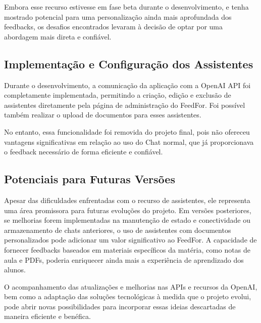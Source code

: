 Embora esse recurso estivesse em fase beta durante o desenvolvimento, e tenha mostrado potencial para uma personalização ainda mais aprofundada dos feedbacks, os desafios encontrados levaram à decisão de optar por uma abordagem mais direta e confiável.

\subsection{Implementação e Configuração dos Assistentes}

Durante o desenvolvimento, a comunicação da aplicação com a OpenAI API foi completamente implementada, permitindo a criação, edição e exclusão de assistentes diretamente pela página de administração do FeedFor. Foi possível também realizar o upload de documentos para esses assistentes.

No entanto, essa funcionalidade foi removida do projeto final, pois não ofereceu vantagens significativas em relação ao uso do Chat normal, que já proporcionava o feedback necessário de forma eficiente e confiável.

\subsection{Potenciais para Futuras Versões}

Apesar das dificuldades enfrentadas com o recurso de assistentes, ele representa uma área promissora para futuras evoluções do projeto. Em versões posteriores, se melhorias forem implementadas na manutenção de estado e conectividade ou armazenamento de chats anteriores, o uso de assistentes com documentos personalizados pode adicionar um valor significativo ao FeedFor. A capacidade de fornecer feedbacks baseados em materiais específicos da matéria, como notas de aula e PDFs, poderia enriquecer ainda mais a experiência de aprendizado dos alunos.

O acompanhamento das atualizações e melhorias nas APIs e recursos da OpenAI, bem como a adaptação das soluções tecnológicas à medida que o projeto evolui, pode abrir novas possibilidades para incorporar essas ideias descartadas de maneira eficiente e benéfica.

